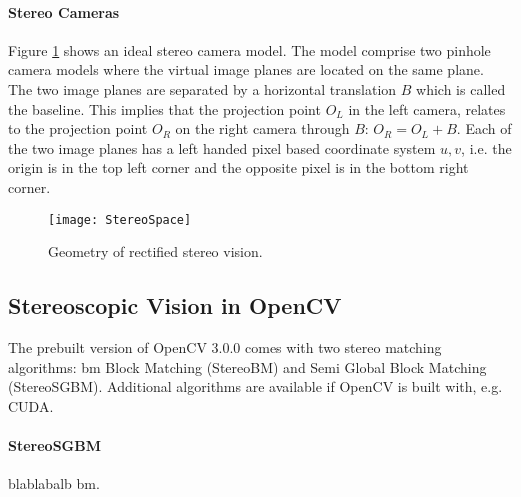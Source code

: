 \paragraph{Stereo Cameras}

Figure \ref{fig:StereoSpace} shows an ideal stereo camera model.  The model comprise two pinhole camera models where the virtual image planes are located on the same plane. The two image planes are separated by a horizontal translation $B$ which is called the baseline. This implies that the projection point $O_L$  in the left camera, relates to the projection point $O_R$ on the right camera through $B$: $O_R = O_L + B$. Each of the two image planes has a left handed pixel based coordinate system $u,v$, i.e. the origin is in the top left corner and the opposite pixel is in the bottom right corner. 

\begin{figure}
\centering
\texttt{[image: StereoSpace]}
\caption{\label{fig:StereoSpace}Geometry of rectified stereo vision.}
\end{figure}

\subsection{Stereoscopic Vision in OpenCV}

The prebuilt version of OpenCV 3.0.0 comes with two stereo matching algorithms: \gls{bm} Block Matching (StereoBM) and Semi Global Block Matching (StereoSGBM). Additional algorithms are available if OpenCV is built with, e.g. CUDA.

\paragraph{StereoSGBM}\cite{hirschmullerstereo}
blablabalb \gls{bm}.
